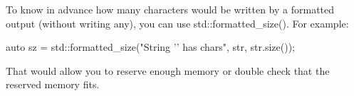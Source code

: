 
To know in advance how many characters would be written by a formatted output (without writing any), you can use std::formatted\_size(). For example:

\begin{cpp}
auto sz = std::formatted_size("String '{}' has {} chars\n", str, str.size());
\end{cpp}

That would allow you to reserve enough memory or double check that the reserved memory fits.






